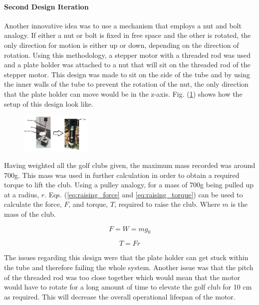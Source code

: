 \documentclass[11pt,landscape]{article}
\begin{document}
\begin{multicols}{3}
\paragraph{Second Design Iteration}
Another innovative idea was to use a mechanism that employs a nut and bolt
analogy. If either a nut or bolt is fixed in free space and the other is
rotated, the only direction for motion is either up or down, depending on the
direction of rotation. Using this methodology, a stepper motor with a threaded
rod was used and a plate holder was attached to a nut that will sit on the
threaded rod of the stepper motor. This design was made to sit on the side of
the tube and by using the inner walls of the tube to prevent the rotation of the
nut, the only direction that the plate holder can move would be in the z-axis.
Fig. (\ref{fig:init_stepper}) shows how the setup of this design look
like. 

\begin{figure}[H]
    \begin{center}
        \includegraphics[width=0.3\textwidth]{Init stepper motor design.PNG}
        \label{fig:init_stepper}
    \end{center}
\end{figure}

Having weighted all the golf clubs given, the maximum mass recorded was around
700g. This mass was used in further calculation in order to obtain a required
torque to lift the club. Using a pulley analogy, for a mass of 700g being pulled
up at a radius, $r$. Eqs. (\ref{eq:raising_force} and \ref{eq:raising_torque}) 
can be used to calculate the force, $F$, and
torque, $T$, required to raise the club. Where $m$ is the mass of the club.
\begin{center}
    \begin{equation}
        F = W = mg_0
        \label{eq:raising_force}
    \end{equation}
\end{center}
\begin{center}
    \begin{equation}
        T = Fr
        \label{eq:raising_torque}
    \end{equation}
\end{center}The issues regarding this design were that the plate holder can get
stuck within the tube and therefore failing the whole system. Another issue was
that the pitch of the threaded rod was too close together which would mean that
the motor would have to rotate for a long amount of time to elevate the golf
club for 10 cm as required. This will decrease the overall operational lifespan
of the motor.


\end{multicols}
\end{document}
